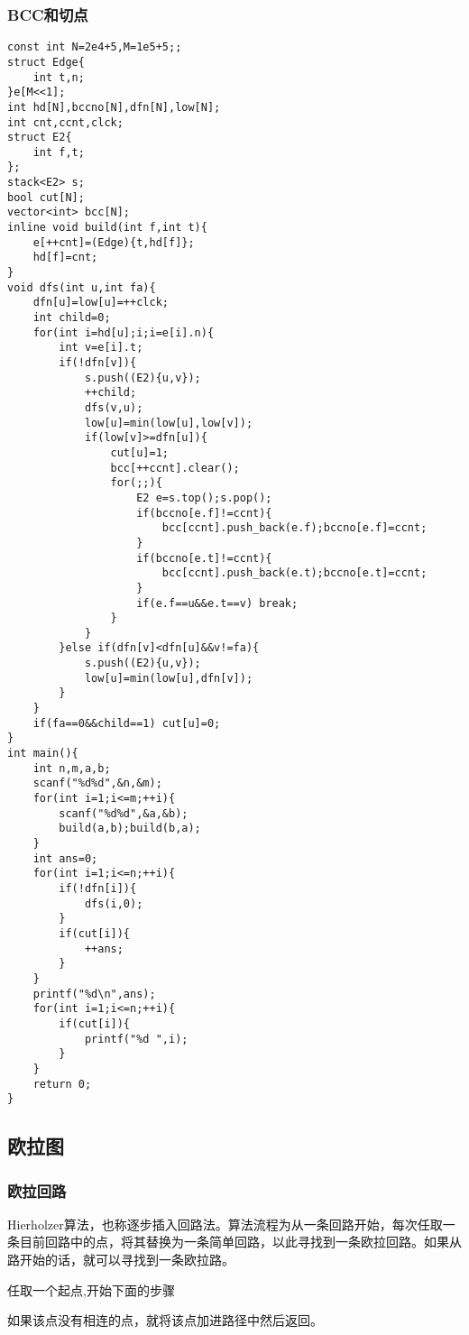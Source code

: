 \documentclass[UTF8]{ctexart}
\begin{document}
\subsubsection{BCC和切点}
\begin{lstlisting}
const int N=2e4+5,M=1e5+5;;
struct Edge{
    int t,n;
}e[M<<1];
int hd[N],bccno[N],dfn[N],low[N];
int cnt,ccnt,clck;
struct E2{
    int f,t;
};
stack<E2> s;
bool cut[N];
vector<int> bcc[N];
inline void build(int f,int t){
    e[++cnt]=(Edge){t,hd[f]};
    hd[f]=cnt;
}
void dfs(int u,int fa){
    dfn[u]=low[u]=++clck;
    int child=0;
    for(int i=hd[u];i;i=e[i].n){
        int v=e[i].t;
        if(!dfn[v]){
            s.push((E2){u,v});
            ++child;
            dfs(v,u);
            low[u]=min(low[u],low[v]);
            if(low[v]>=dfn[u]){
                cut[u]=1;
                bcc[++ccnt].clear();
                for(;;){
                    E2 e=s.top();s.pop();
                    if(bccno[e.f]!=ccnt){
                        bcc[ccnt].push_back(e.f);bccno[e.f]=ccnt;
                    }
                    if(bccno[e.t]!=ccnt){
                        bcc[ccnt].push_back(e.t);bccno[e.t]=ccnt;
                    }
                    if(e.f==u&&e.t==v) break;
                }
            }
        }else if(dfn[v]<dfn[u]&&v!=fa){
            s.push((E2){u,v});
            low[u]=min(low[u],dfn[v]);
        }
    }
    if(fa==0&&child==1) cut[u]=0;
}
int main(){
    int n,m,a,b;
    scanf("%d%d",&n,&m);
    for(int i=1;i<=m;++i){
        scanf("%d%d",&a,&b);
        build(a,b);build(b,a);
    }
    int ans=0;
    for(int i=1;i<=n;++i){
        if(!dfn[i]){
            dfs(i,0);
        }
        if(cut[i]){
            ++ans;
        }
    }
    printf("%d\n",ans);
    for(int i=1;i<=n;++i){
        if(cut[i]){
            printf("%d ",i);
        }
    }
    return 0;
}    
\end{lstlisting}
\subsection{欧拉图}
\subsubsection{欧拉回路}
Hierholzer算法，也称逐步插入回路法。算法流程为从一条回路开始，每次任取一条目前回路中的点，将其替换为一条简单回路，以此寻找到一条欧拉回路。如果从路开始的话，就可以寻找到一条欧拉路。

任取一个起点,开始下面的步骤

如果该点没有相连的点，就将该点加进路径中然后返回。
\end{document}
